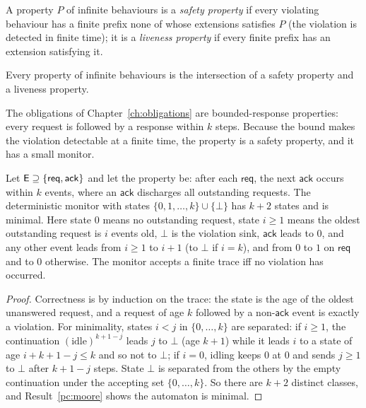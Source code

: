 A property $P$ of infinite behaviours is a \emph{safety property} if every violating behaviour has a finite prefix none of whose extensions satisfies $P$ (the violation is detected in finite time); it is a \emph{liveness property} if every finite prefix has an extension satisfying it.

\begin{established}\label{pc:alpern}
Every property of infinite behaviours is the intersection of a safety property and a liveness property.
\end{established}

The obligations of Chapter~\ref{ch:obligations} are bounded-response properties: every request is followed by a response within $k$ steps. Because the bound makes the violation detectable at a finite time, the property is a safety property, and it has a small monitor.

\begin{newresult}\label{pc:monitor}
Let $\mathsf{E}\supseteq\{\mathsf{req},\mathsf{ack}\}$ and let the property be: after each $\mathsf{req}$, the next $\mathsf{ack}$ occurs within $k$ events, where an $\mathsf{ack}$ discharges all outstanding requests. The deterministic monitor with states $\{0,1,\dots,k\}\cup\{\bot\}$ has $k+2$ states and is minimal. Here state $0$ means no outstanding request, state $i\ge1$ means the oldest outstanding request is $i$ events old, $\bot$ is the violation sink, $\mathsf{ack}$ leads to $0$, and any other event leads from $i\ge1$ to $i+1$ (to $\bot$ if $i=k$), and from $0$ to $1$ on $\mathsf{req}$ and to $0$ otherwise. The monitor accepts a finite trace iff no violation has occurred.
\end{newresult}
\begin{proof}
Correctness is by induction on the trace: the state is the age of the oldest unanswered request, and a request of age $k$ followed by a non-$\mathsf{ack}$ event is exactly a violation. For minimality, states $i<j$ in $\{0,\dots,k\}$ are separated: if $i\ge1$, the continuation $(\text{idle})^{k+1-j}$ leads $j$ to $\bot$ (age $k+1$) while it leads $i$ to a state of age $i+k+1-j\le k$ and so not to $\bot$; if $i=0$, idling keeps $0$ at $0$ and sends $j\ge1$ to $\bot$ after $k+1-j$ steps. State $\bot$ is separated from the others by the empty continuation under the accepting set $\{0,\dots,k\}$. So there are $k+2$ distinct classes, and Result~\ref{pc:moore} shows the automaton is minimal.
\end{proof}

